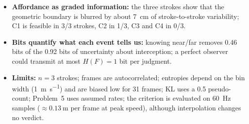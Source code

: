 \begin{itemize}
    \item \textbf{Affordance as graded information:} the three strokes show that the geometric boundary is blurred by about \SI{7}{\centi\meter} of stroke-to-stroke variability; C1 is feasible in 3/3 strokes, C2 in 1/3, C3 and C4 in 0/3.
    \item \textbf{Bits quantify what each event tells us:} knowing near/far removes 0.46 bits of the 0.92 bits of uncertainty about interception; a perfect observer could transmit at most $H(F)=1$ bit per judgment.
    \item \textbf{Limits:} $n=3$ strokes; frames are autocorrelated; entropies depend on the bin width (\SI{1}{\meter\per\second}) and are biased low for 31 frames; KL uses a 0.5 pseudo-count; Problem~5 uses assumed rates; the criterion is evaluated on \SI{60}{\hertz} samples ($\approx\SI{0.13}{\meter}$ per frame at peak speed), although interpolation changes no verdict.
\end{itemize}